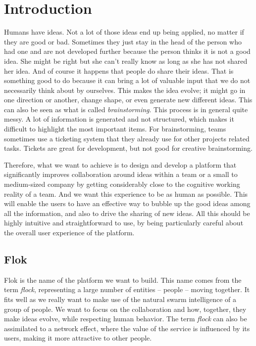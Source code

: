 \documentclass[a4paper,12pt,twoside]{article}
\begin{document}
\tableofcontents
\cleardoublepage

\setcounter{page}{1}


\section{Introduction}
Humans have ideas. Not a lot of those ideas end up being applied, no matter if they are good or bad.
Sometimes they just stay in the head of the person who had one and are not developed further because the person thinks it is not a good idea.
She might be right but she can't really know as long as she has not shared her idea.
And of course it happens that people do share their ideas.
That is something good to do because it can bring a lot of valuable input that we do not necessarily think about by ourselves.
This makes the idea evolve; it might go in one direction or another, change shape, or even generate new different ideas.
This can also be seen as what is called \emph{brainstorming}. This process is in general quite messy.
A lot of information is generated and not structured, which makes it difficult to highlight the most important items.
For brainstorming, teams sometimes use a ticketing system that they already use for other projects related tasks.
Tickets are great for development, but not good for creative brainstorming.

Therefore, what we want to achieve is to design and develop a platform that significantly improves collaboration around ideas within a team or a small to medium-sized company by getting considerably close to the cognitive working reality of a team.
And we want this experience to be as human as possible.
This will enable the users to have an effective way to bubble up the good ideas among all the information, and also to drive the sharing of new ideas.
All this should be highly intuitive and straightforward to use, by being particularly careful about the overall user experience of the platform.

\subsection{Flok}
Flok is the name of the platform we want to build.
This name comes from the term \emph{flock}, representing a large number of entities – people – moving together.
It fits well as we really want to make use of the natural swarm intelligence of a group of people.
We want to focus on the collaboration and how, together, they make ideas evolve, while respecting human behavior.
The term \emph{flock} can also be assimilated to a network effect, where the value of the service is influenced by its users, making it more attractive to other people.
\end{document}
